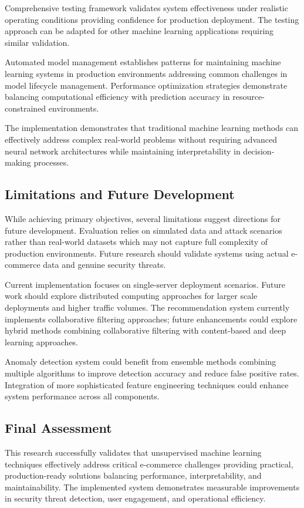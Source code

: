 \documentclass[12pt]{article}
\begin{document}
Comprehensive testing framework validates system effectiveness under realistic operating conditions providing confidence for production deployment. The testing approach can be adapted for other machine learning applications requiring similar validation.

Automated model management establishes patterns for maintaining machine learning systems in production environments addressing common challenges in model lifecycle management. Performance optimization strategies demonstrate balancing computational efficiency with prediction accuracy in resource-constrained environments.

The implementation demonstrates that traditional machine learning methods can effectively address complex real-world problems without requiring advanced neural network architectures while maintaining interpretability in decision-making processes.

\subsection{Limitations and Future Development}
While achieving primary objectives, several limitations suggest directions for future development. Evaluation relies on simulated data and attack scenarios rather than real-world datasets which may not capture full complexity of production environments. Future research should validate systems using actual e-commerce data and genuine security threats.

Current implementation focuses on single-server deployment scenarios. Future work should explore distributed computing approaches for larger scale deployments and higher traffic volumes. The recommendation system currently implements collaborative filtering approaches; future enhancements could explore hybrid methods combining collaborative filtering with content-based and deep learning approaches.

Anomaly detection system could benefit from ensemble methods combining multiple algorithms to improve detection accuracy and reduce false positive rates. Integration of more sophisticated feature engineering techniques could enhance system performance across all components.

\subsection{Final Assessment}
This research successfully validates that unsupervised machine learning techniques effectively address critical e-commerce challenges providing practical, production-ready solutions balancing performance, interpretability, and maintainability. The implemented system demonstrates measurable improvements in security threat detection, user engagement, and operational efficiency.
\end{document}

